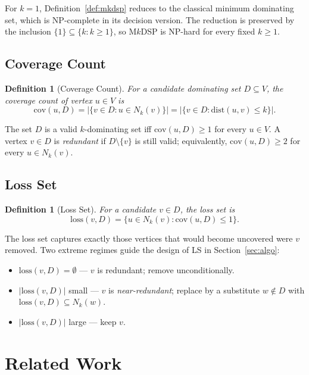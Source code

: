 \documentclass[11pt,a4paper]{article}
\newtheorem{definition}[theorem]{Definition}
\newcommand{\cov}{\mathrm{cov}}
\newcommand{\loss}{\mathrm{loss}}
\begin{document}
For $k=1$, Definition~\ref{def:mkdsp} reduces to the classical minimum
dominating set, which is NP-complete in its decision version. The
reduction is preserved by the inclusion $\{1\}\subseteq\{k:k\ge 1\}$,
so M$k$DSP is NP-hard for every fixed $k\ge 1$.

\subsection{Coverage Count}

\begin{definition}[Coverage Count]
\label{def:cov}
For a candidate dominating set $D\subseteq V$, the \emph{coverage count}
of vertex $u\in V$ is
\[
  \cov(u,D) = |\{v\in D : u\in N_k(v)\}|
            = |\{v\in D : \mathrm{dist}(u,v)\le k\}|.
\]
\end{definition}

The set $D$ is a valid $k$-dominating set iff $\cov(u,D)\ge 1$ for every
$u\in V$. A vertex $v\in D$ is \emph{redundant} if $D\setminus\{v\}$ is
still valid; equivalently, $\cov(u,D)\ge 2$ for every $u\in N_k(v)$.

\subsection{Loss Set}

\begin{definition}[Loss Set]
\label{def:loss}
For a candidate $v\in D$, the \emph{loss set} is
\[
  \loss(v,D) = \{u\in N_k(v) : \cov(u,D) \le 1\}.
\]
\end{definition}

The loss set captures exactly those vertices that would become uncovered
were $v$ removed. Two extreme regimes guide the design of LS in
Section~\ref{sec:algo}:
\begin{itemize}[nosep]
  \item $\loss(v,D)=\emptyset$ — $v$ is redundant; remove unconditionally.
  \item $|\loss(v,D)|$ small — $v$ is \emph{near-redundant}; replace by a
    substitute $w\notin D$ with $\loss(v,D)\subseteq N_k(w)$.
  \item $|\loss(v,D)|$ large — keep $v$.
\end{itemize}


\section{Related Work}
\label{sec:related}
\end{document}
